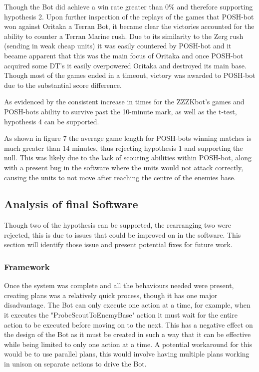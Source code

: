 \documentclass[journal]{IEEEtran}
\begin{document}
	Though the Bot did achieve a win rate greater than 0\% and therefore supporting hypothesis 2. Upon further inspection of the replays of the games that POSH-bot won against Oritaka a Terran Bot, it became clear the victories accounted for the ability to counter a Terran Marine rush. Due to its similarity to the Zerg rush (sending in weak cheap units) it was easily countered by POSH-bot and it became apparent that this was the main focus of Oritaka and once POSH-bot acquired some DT's it easily overpowered Oritaka and destroyed its main base. Though most of the games ended in a timeout, victory was awarded to POSH-bot due to the substantial score difference.
	
	As evidenced by the consistent increase in times for the ZZZKbot's games and POSH-bots ability to survive past the 10-minute mark, as well as the t-test, hypothesis 4 can be supported. 
	
	As shown in figure 7 the average game length for POSH-bots winning matches is much greater than 14 minutes, thus rejecting hypothesis 1 and supporting the null. This was likely due to the lack of scouting abilities within POSH-bot, along with a present bug in the software where the units would not attack correctly, causing the units to not move after reaching the centre of the enemies base. 
	
	\subsection{Analysis of final Software}
	Though two of the hypothesis can be supported, the rearranging two were rejected, this is due to issues that could be improved on in the software. This section will identify those issue and present potential fixes for future work.
	\newline
	
	\subsubsection{Framework}    
	Once the system was complete and all the behaviours needed were present, creating plans was a relatively quick process, though it has one major disadvantage. The Bot can only execute one action at a time, for example, when it executes the "ProbeScoutToEnemyBase" action it must wait for the entire action to be executed before moving on to the next. This has a negative effect on the design of the Bot as it must be created in such a way that it can be effective while being limited to only one action at a time. A potential workaround for this would be to use parallel plans, this would involve having multiple plans working in unison on separate actions to drive the Bot.    
	
\end{document}
